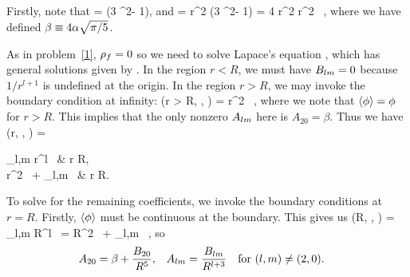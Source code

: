 \begin{solution}
	Firstly, note that
	\beq
		\Ytotv =   (3 \cos^2\tht - 1),
	\eeq
	and
	\beq
		\phio = \alp r^2 (3 \cos^2\tht - 1) = 4 \alp r^2  \Ytotv \equiv \beta r^2 \, \Ytotv,
	\eeq
	where we have defined $\beta \equiv 4 \alpha \sqrt{\pi/5}$.

	As in problem~\ref{1}, $\rho_f = 0$ so we need to solve Lapace's equation , which has general solutions given by .  In the region $r < R$, we must have $B_{l m} = 0$ because $1/r^{l+1}$ is undefined at the origin.  In the region $r > R$, we may invoke the boundary condition at infinity:
	\beq
		\phi(r > R, \tht, \vph) \to \phio = \beta r^2 \, \Ytotv,
	\eeq
	where we note that $\evphi = \phi$ for $r > R$.  This implies that the only nonzero $A_{l m}$ here is $A_{2 0} = \beta$.  Thus we have
	\beq
		\evphi\!(r, \tht, \vph) = \begin{cases}
			\dsum_{l,m} \Alm r^l \, \Ylm\tv & \tif r \leq R, \\[2ex]
			\beta r^2 \, \Ytotv + \dsum_{l,m}  \, \Ylm\tv & \tif r \geq R.
		\end{cases}
	\eeq
	
	To solve for the remaining coefficients, we invoke the boundary conditions at $r = R$.  Firstly, $\evphi$ must be continuous at the boundary.  This gives us
	\beq
		\evphi\!(R, \tht, \vph) = \sum_{l,m} \Alm R^l \, \Ylm\tv = \beta R^2 \, \Ytotv + \sum_{l,m}  \, \Ylm\tv,
	\eeq
	so
	\begin{align} \label{c1}
		A_{2 0} &= \beta + \dfrac{B_{2 0}}{R^{5}}, &
		A_{l m} &= \frac{B_{l m}}{R^{l+3}} \quad \text{for } (l,m) \neq (2,0).
	\end{align}
	

\end{solution}
